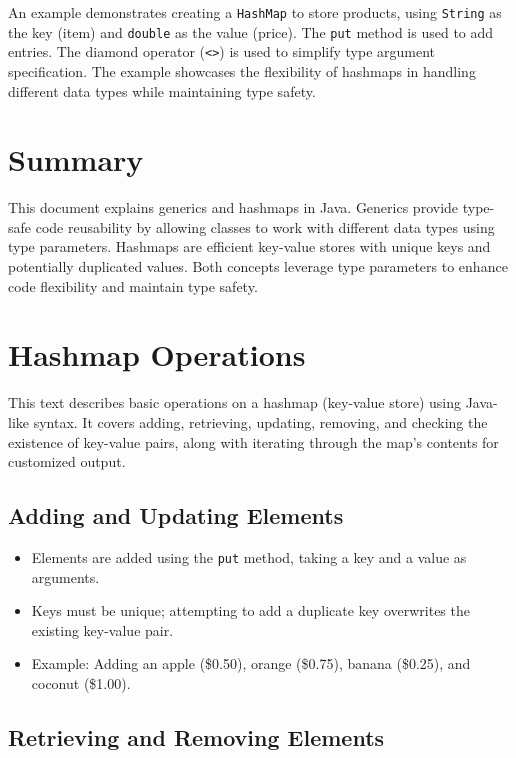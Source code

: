 \documentclass{article}
\begin{document}
\begin{itemize}
An example demonstrates creating a \texttt{HashMap} to store products, using \texttt{String} as the key (item) and \texttt{double} as the value (price). The \texttt{put} method is used to add entries.  The diamond operator (\texttt{<>}) is used to simplify type argument specification.  The example showcases the flexibility of hashmaps in handling different data types while maintaining type safety.


\section{Summary}

This document explains generics and hashmaps in Java. Generics provide type-safe code reusability by allowing classes to work with different data types using type parameters. Hashmaps are efficient key-value stores with unique keys and potentially duplicated values.  Both concepts leverage type parameters to enhance code flexibility and maintain type safety.


\section{Hashmap Operations}

This text describes basic operations on a hashmap (key-value store) using Java-like syntax.  It covers adding, retrieving, updating, removing, and checking the existence of key-value pairs, along with iterating through the map's contents for customized output.

\subsection{Adding and Updating Elements}

\begin{itemize}
    \item Elements are added using the \texttt{put} method, taking a key and a value as arguments.
    \item Keys must be unique; attempting to add a duplicate key overwrites the existing key-value pair.
    \item Example:  Adding an apple (\$0.50), orange (\$0.75), banana (\$0.25), and coconut (\$1.00).
\end{itemize}

\subsection{Retrieving and Removing Elements}


\end{itemize}
\end{document}
